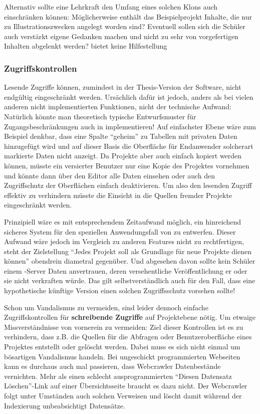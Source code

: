 Alternativ sollte eine Lehrkraft den Umfang eines solchen Klons auch einschränken können: Möglicherweise enthält das Beispielprojekt Inhalte, die nur zu Illustrationszwecken angelegt worden sind? Eventuell sollen sich die Schüler auch verstärkt eigene Gedanken machen und nicht zu sehr von vorgefertigen Inhalten abgelenkt werden? \idename bietet keine Hilfestellung 

\subsubsection{Zugriffskontrollen}

Lesende Zugriffe können, zumindest in der Thesis-Version der Software, nicht endgültig eingeschränkt werden. Ursächlich dafür ist jedoch, anders als bei vielen anderen nicht implementierten Funktionen, nicht der technische Aufwand: Natürlich könnte man theoretisch typische Entwurfsmuster für Zugangsbeschränkungen auch in \idename implementieren! Auf einfachster Ebene wäre zum Beispiel denkbar, dass eine Spalte "`geheim"' zu Tabellen mit privaten Daten hinzugefügt wird und auf dieser Basis die Oberfläche für Endanwender solcherart markierte Daten nicht anzeigt. Da Projekte aber auch einfach kopiert werden können, müsste ein versierter Benutzer nur eine Kopie des Projektes vornehmen und könnte dann über den Editor alle Daten einsehen oder auch den Zugriffschutz der Oberflächen einfach deaktivieren. Um also den lesenden Zugriff effektiv zu verhindern müsste die Einsicht in die Quellen fremder Projekte eingeschränkt werden.

Prinzipiell wäre es mit entsprechendem Zeitaufwand möglich, ein hinreichend sicheres System für den speziellen Anwendungsfall von \idename zu entwerfen. Dieser Aufwand wäre jedoch im Vergleich zu anderen Features nicht zu rechtfertigen, steht der Zielstellung "`Jedes Projekt soll als Grundlage für neue Projekte dienen können"' obendrein diametral gegenüber. Und abgesehen davon sollte kein Schüler einem \idename-Server Daten anvertrauen, deren versehentliche Veröffentlichung er oder sie nicht verkraften würde. Das gilt selbstverständlich auch für den Fall, dass eine hypothetische künftige Version einen solchen Zugriffsschutz vorsehen sollte!

Schon um Vandalismus zu vermeiden, sind leider dennoch einfache Zugriffskontrollen für \textbf{schreibende Zugriffe} auf Projektebene nötig. Um etwaige Missverständnisse von vornerein zu vermeiden: Ziel dieser Kontrollen ist es zu verhindern, dass z.B. die Quellen für die Abfragen oder Benutzeroberfläche eines Projektes entstellt oder gelöscht werden. Dabei muss es sich nicht einmal um bösartigen Vandalismus handeln. Bei ungeschickt programmierten Webseiten kann es durchaus auch mal passieren, dass Webcrawler Datenbestände vernichten. Mehr als einen schlecht ausprogrammierten "`Diesen Datensatz Löschen"'-Link auf einer Übersichtsseite braucht es dazu nicht. Der Webcrawler folgt unter Umständen auch solchen Verweisen und löscht damit während der Indexierung unbeabsichtigt Datensätze.

